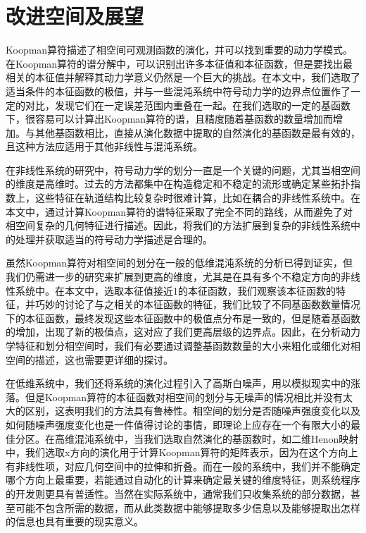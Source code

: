 \section{改进空间及展望}

Koopman算符描述了相空间可观测函数的演化，并可以找到重要的动力学模式。在Koopman算符的谱分解中，可以识别出许多本征值和本征函数，但是要找出最相关的本征值并解释其动力学意义仍然是一个巨大的挑战。在本文中，我们选取了适当条件的本征函数的极值，并与一些混沌系统中符号动力学的边界点位置作了一定的对比，发现它们在一定误差范围内重叠在一起。在我们选取的一定的基函数下，很容易可以计算出Koopman算符的谱，且精度随着基函数的数量增加而增加。与其他基函数相比，直接从演化数据中提取的自然演化的基函数是最有效的，且这种方法应适用于其他非线性与混沌系统。

在非线性系统的研究中，符号动力学的划分一直是一个关键的问题，尤其当相空间的维度是高维时。过去的方法都集中在构造稳定和不稳定的流形或确定某些拓扑指数上，这些特征在轨道结构比较复杂时很难计算，比如在耦合的非线性系统中。在本文中，通过计算Koopman算符的谱特征采取了完全不同的路线，从而避免了对相空间复杂的几何特征进行描述。因此，将我们的方法扩展到复杂的非线性系统中的处理并获取适当的符号动力学描述是合理的。

虽然Koopman算符对相空间的划分在一般的低维混沌系统的分析已得到证实，但我们仍需进一步的研究来扩展到更高的维度，尤其是在具有多个不稳定方向的非线性系统中。在本文中，选取本征值接近1的本征函数，我们观察该本征函数的特征，并巧妙的讨论了与之相关的本征函数的特征，我们比较了不同基函数数量情况下的本征函数，最终发现这些本征函数中的极值点分布是一致的，但是随着基函数的增加，出现了新的极值点，这对应了我们更高层级的边界点。因此，在分析动力学特征和划分相空间时，我们有必要通过调整基函数数量的大小来粗化或细化对相空间的描述，这也需要更详细的探讨。

在低维系统中，我们还将系统的演化过程引入了高斯白噪声，用以模拟现实中的涨落。但是Koopman算符的本征函数对相空间的划分与无噪声的情况相比并没有太大的区别，这表明我们的方法具有鲁棒性。相空间的划分是否随噪声强度变化以及如何随噪声强度变化也是一件值得讨论的事情，即理论上应存在一个有限大小的最佳分区。在高维混沌系统中，当我们选取自然演化的基函数时，如二维Henon映射中，我们选取x方向的演化用于计算Koopman算符的矩阵表示，因为在这个方向上有非线性项，对应几何空间中的拉伸和折叠。而在一般的系统中，我们并不能确定哪个方向上最重要，若能通过自动化的计算来确定最关键的维度特征，则系统程序的开发则更具有普适性。当然在实际系统中，通常我们只收集系统的部分数据，甚至可能不包含所需的数据，而从此类数据中能够提取多少信息以及能够提取出怎样的信息也具有重要的现实意义。

